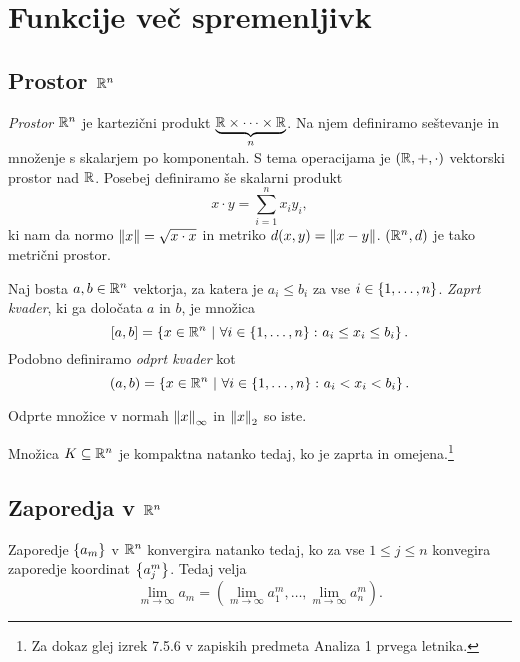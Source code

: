 \section{Funkcije več spremenljivk}

\subsection{Prostor $\mathbb{R}^n$}

\begin{definicija}
\emph{Prostor $\mathbb{R}^n$} je kartezični produkt
$\underbrace{\mathbb{R} \times \dots \times \mathbb{R}}_n$. Na njem definiramo
seštevanje in množenje s skalarjem po komponentah. S tema
operacijama je $(\mathbb{R},+,\cdot)$ vektorski prostor nad $\mathbb{R}$. Posebej
definiramo še skalarni produkt
\[
x \cdot y = \sum_{i=1}^n x_iy_i,
\]
ki nam da normo $\left\lVert x\right\rVert=\sqrt{x \cdot x}$ in metriko
$d(x,y) = \left\lVert x-y\right\rVert$. $(\mathbb{R}^n,d)$ je tako metrični prostor.
\end{definicija}

\begin{definicija}
Naj bosta $a,b \in \mathbb{R}^n$ vektorja, za katera je $a_i \leq b_i$ za
vse $i \in \left\{1,\dots,n\right\}$. \emph{Zaprt kvader}, ki
ga določata $a$ in $b$, je množica
\[
[a,b] = \left\{x\in\mathbb{R}^n~\middle\vert~\forall i \in \left\{1,\dots,n\right\} \colon
a_i \leq x_i \leq b_i\right\}.
\]
Podobno definiramo \emph{odprt kvader} kot
\[
(a,b) = \left\{x\in\mathbb{R}^n~\middle\vert~\forall i \in \left\{1,\dots,n\right\} \colon
a_i < x_i < b_i\right\}.
\]
\end{definicija}

\begin{opomba}
Odprte množice v normah $\left\lVert x\right\rVert_\infty$ in $\left\lVert x\right\rVert_2$ so iste.
\end{opomba}

\begin{izrek}
Množica $K\subseteq\mathbb{R}^n$ je kompaktna natanko tedaj, ko je zaprta
in omejena.\footnote{Za dokaz glej izrek 7.5.6 v zapiskih predmeta
Analiza 1 prvega letnika.}
\end{izrek}

\newpage

\subsection{Zaporedja v $\mathbb{R}^n$}

\begin{trditev}
Zaporedje $\left\{a_m\right\}$ v $\mathbb{R}^n$ konvergira natanko tedaj, ko za vse
$1 \leq j \leq n$ konvegira zaporedje koordinat $\left\{a_j^m\right\}$.
Tedaj velja
\[
\lim_{m\to\infty} a_m = \left(\lim_{m\to\infty} a_1^m, \dots,
\lim_{m\to\infty} a_n^m\right).
\]
\end{trditev}

